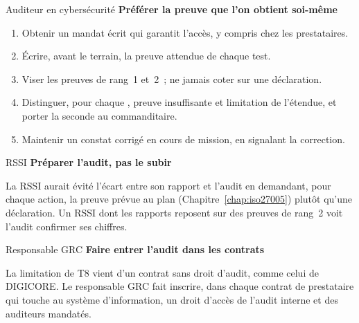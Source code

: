 \begin{boxmetier}{Auditeur en cybersécurité}
\textbf{Préférer la preuve que l'on obtient soi-même}
\begin{enumerate}
    \item Obtenir un mandat écrit qui garantit l'accès, y compris chez les
          prestataires.
    \item Écrire, avant le terrain, la preuve attendue de chaque test.
    \item Viser les preuves de rang~1 et~2~; ne jamais coter \OUI{} sur une
          déclaration.
    \item Distinguer, pour chaque \NEK{}, preuve insuffisante et limitation
          de l'étendue, et porter la seconde au commanditaire.
    \item Maintenir un constat corrigé en cours de mission, en signalant la
          correction.
\end{enumerate}
\end{boxmetier}

\begin{boxmetier}{RSSI}
\textbf{Préparer l'audit, pas le subir}

La RSSI aurait évité l'écart entre son rapport et l'audit en demandant,
pour chaque action, la preuve prévue au plan (Chapitre~\ref{chap:iso27005})
plutôt qu'une déclaration. Un RSSI dont les rapports reposent sur des
preuves de rang~2 voit l'audit confirmer ses chiffres.
\end{boxmetier}

\begin{boxmetier}{Responsable GRC}
\textbf{Faire entrer l'audit dans les contrats}

La limitation de T8 vient d'un contrat sans droit d'audit, comme celui de
DIGICORE. Le responsable GRC fait inscrire, dans chaque contrat de
prestataire qui touche au système d'information, un droit d'accès de
l'audit interne et des auditeurs mandatés.
\end{boxmetier}

\separateur

